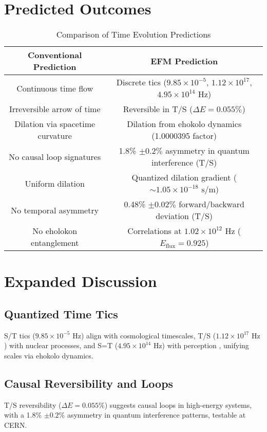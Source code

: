 \documentclass[11pt]{article}
\begin{document}
\section{Predicted Outcomes}
\begin{table}[htbp]
    \centering
    \begin{tabular}{|c|c|}
        \hline
        \textbf{Conventional Prediction} & \textbf{EFM Prediction} \\
        \hline
        Continuous time flow & Discrete tics (\(9.85 \times 10^{-5}\), \(1.12 \times 10^{17}\), \(4.95 \times 10^{14} \text{ Hz}\)) \\
        Irreversible arrow of time & Reversible in T/S (\(\Delta E = 0.055\%\)) \\
        Dilation via spacetime curvature & Dilation from ehokolo dynamics (1.0000395 factor) \\
        No causal loop signatures & 1.8\% \(\pm 0.2\%\) asymmetry in quantum interference (T/S) \\
        Uniform dilation & Quantized dilation gradient (\(\sim 1.05 \times 10^{-18} \text{ s/m}\)) \\
        No temporal asymmetry & 0.48\% \(\pm 0.02\%\) forward/backward deviation (T/S) \\
        No eholokon entanglement & Correlations at \(1.02 \times 10^{12} \text{ Hz}\) (\(E_{\text{flux}} = 0.925\)) \\
        \hline
    \end{tabular}
    \caption{Comparison of Time Evolution Predictions}
    \label{tab:predictions}
\end{table}

\section{Expanded Discussion}
\subsection{Quantized Time Tics}
S/T tics (\(9.85 \times 10^{-5} \text{ Hz}\)) align with cosmological timescales, T/S (\(1.12 \times 10^{17} \text{ Hz}\)) with nuclear processes, and S=T (\(4.95 \times 10^{14} \text{ Hz}\)) with perception \citep{emvula2025configurations}, unifying scales via ehokolo dynamics.

\subsection{Causal Reversibility and Loops}
T/S reversibility (\(\Delta E = 0.055\%\)) suggests causal loops in high-energy systems, with a 1.8\% \(\pm 0.2\%\) asymmetry in quantum interference patterns, testable at CERN.
\end{document}
